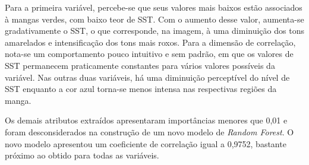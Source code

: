 \begin{figure}[H]
	\label{fig:var_atts}
\end{figure}

Para a primeira variável, percebe-se que seus valores mais baixos estão associados à mangas verdes, com baixo teor de SST. Com o aumento desse valor, aumenta-se gradativamente o SST, o que corresponde, na imagem, à uma diminuição dos tons amarelados e intensificação dos tons mais roxos. Para a dimensão de correlação, nota-se um comportamento pouco intuitivo e sem padrão, em que os valores de SST permanecem praticamente constantes para vários valores possíveis da variável. Nas outras duas variáveis, há uma diminuição perceptível do nível de SST enquanto a cor azul torna-se menos intensa nas respectivas regiões da manga.

Os demais atributos extraídos apresentaram importâncias menores que 0,01 e foram desconsiderados na construção de um novo modelo de \textit{Random Forest}. O novo modelo apresentou um coeficiente de correlação igual a 0,9752, bastante próximo ao obtido para todas as variáveis.

 

